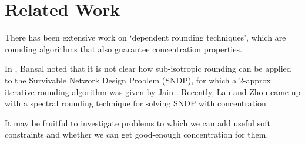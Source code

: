 \section{Related Work}

There has been extensive work on `dependent rounding techniques',
which are rounding algorithms that also guarantee concentration properties.

In \cite{bansal19rounding}, Bansal noted that it is not clear how sub-isotropic rounding
can be applied to the Survivable Network Design Problem (SNDP),
for which a 2-approx iterative rounding algorithm was given by Jain \cite{jain-sndp}.
Recently, Lau and Zhou came up with a spectral rounding technique for solving
SNDP with concentration \cite{spectral-rounding}.

It may be fruitful to investigate problems to which we can add useful soft constraints
and whether we can get good-enough concentration for them.
